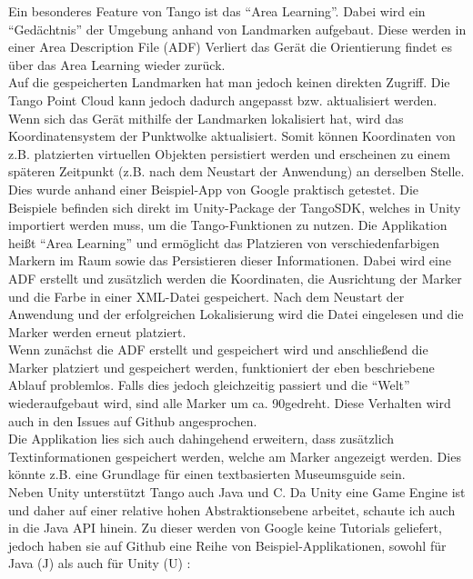 Ein besonderes Feature von Tango ist das "`Area Learning"'. Dabei wird ein "`Gedächtnis"' der Umgebung anhand von Landmarken aufgebaut. Diese werden in einer Area Description File (ADF) Verliert das Gerät die Orientierung findet es über das Area Learning wieder zurück.\cite{fehling}\\
Auf die gespeicherten Landmarken hat man jedoch keinen direkten Zugriff. Die Tango Point Cloud kann jedoch dadurch angepasst bzw. aktualisiert werden. Wenn sich das Gerät mithilfe der Landmarken lokalisiert hat, wird das Koordinatensystem der Punktwolke aktualisiert. Somit können Koordinaten von z.B. platzierten virtuellen Objekten persistiert werden und erscheinen zu einem späteren Zeitpunkt (z.B. nach dem Neustart der Anwendung) an derselben Stelle.\\
Dies wurde anhand einer Beispiel-App von Google praktisch getestet. Die Beispiele befinden sich direkt im Unity-Package der TangoSDK, welches in Unity importiert werden muss, um die Tango-Funktionen zu nutzen. Die Applikation heißt "`Area Learning"' und ermöglicht das Platzieren von verschiedenfarbigen Markern im Raum sowie das Persistieren dieser Informationen. Dabei wird eine ADF erstellt und zusätzlich werden die Koordinaten, die Ausrichtung der Marker und die Farbe in einer XML-Datei gespeichert. Nach dem Neustart der Anwendung und der erfolgreichen Lokalisierung wird die Datei eingelesen und die Marker werden erneut platziert.\\
Wenn zunächst die ADF erstellt und gespeichert wird und anschließend die Marker platziert und gespeichert werden, funktioniert der eben beschriebene Ablauf problemlos. Falls dies jedoch gleichzeitig passiert und die "`Welt"' wiederaufgebaut wird, sind alle Marker um ca. 90\degree gedreht. Diese Verhalten wird auch in den Issues auf Github angesprochen\cite{tango_unity_github_issue100}.\\
Die Applikation lies sich auch dahingehend erweitern, dass zusätzlich Textinformationen gespeichert werden, welche am Marker angezeigt werden. Dies könnte z.B. eine Grundlage für einen textbasierten Museumsguide sein.\\
Neben Unity unterstützt Tango auch Java und C. Da Unity eine Game Engine ist und daher auf einer relative hohen Abstraktionsebene arbeitet, schaute ich auch in die Java API hinein. Zu dieser werden von Google keine Tutorials geliefert, jedoch haben sie auf Github eine Reihe von Beispiel-Applikationen, sowohl für Java (J)  \cite{tango_java_github} als auch für Unity (U) \cite{tango_unity_github}:
